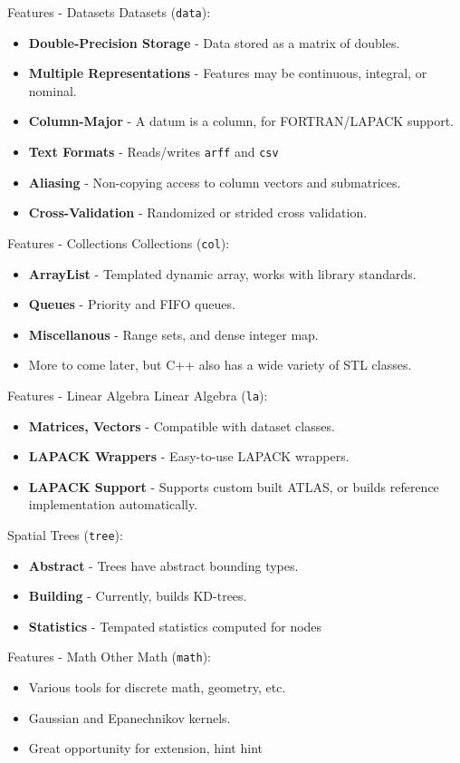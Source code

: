 \documentclass[pdf,colorBG,slideColor]{prosper}
\newcommand{\itemt}[1]{\item {\bf #1} -}
\begin{document}
\begin{slide}{Features - Datasets}
 Datasets ({\tt data}):
 \begin{itemize}
 \itemt{Double-Precision Storage} Data stored as a matrix of doubles.
 \itemt{Multiple Representations} Features may be continuous, integral, or nominal.
 \itemt{Column-Major} A datum is a column, for FORTRAN/LAPACK support.
 \itemt{Text Formats} Reads/writes {\tt arff} and {\tt csv}
 \itemt{Aliasing} Non-copying access to column vectors and submatrices.
 \itemt{Cross-Validation} Randomized or strided cross validation.
 \end{itemize}
\end{slide}

\begin{slide}{Features - Collections}
 Collections ({\tt col}):
 \begin{itemize}
 \itemt{ArrayList} Templated dynamic array, works with library standards.
 \itemt{Queues} Priority and FIFO queues.
 \itemt{Miscellanous} Range sets, and dense integer map.
 \item More to come later, but C++ also has a wide variety of STL classes.
 \end{itemize}
\end{slide}

\begin{slide}{Features - Linear Algebra}
 Linear Algebra ({\tt la}):
 \begin{itemize}
 \itemt{Matrices, Vectors} Compatible with dataset classes.
 \itemt{LAPACK Wrappers} Easy-to-use LAPACK wrappers.
 \itemt{LAPACK Support}
 Supports custom built ATLAS, or builds reference implementation automatically.
 \end{itemize}
 \vspace*{.2in}
 Spatial Trees ({\tt tree}):
 \begin{itemize}
 \itemt{Abstract} Trees have abstract bounding types.
 \itemt{Building} Currently, builds KD-trees.
 \itemt{Statistics} Tempated statistics computed for nodes
 \end{itemize}
\end{slide}

\begin{slide}{Features - Math}
 Other Math ({\tt math}): \\
 \begin{itemize}
 \item Various tools for discrete math, geometry, etc.
 \item Gaussian and Epanechnikov kernels.
 \item Great opportunity for extension, hint hint
 \end{itemize}
\end{slide}
\end{document}
